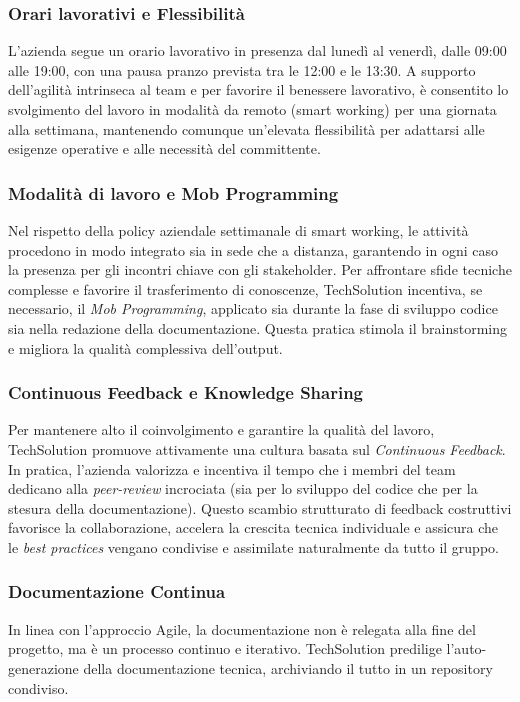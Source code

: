 \documentclass[12pt, a4paper]{article}
\begin{document}
\subsubsection{Orari lavorativi e Flessibilità}
L'azienda segue un orario lavorativo in presenza dal lunedì al venerdì, dalle 09:00 alle 19:00, con una pausa pranzo prevista tra le 12:00 e le 13:30. A supporto dell'agilità intrinseca al team e per favorire il benessere lavorativo, è consentito lo svolgimento del lavoro in modalità da remoto (smart working) per una giornata alla settimana, mantenendo comunque un'elevata flessibilità per adattarsi alle esigenze operative e alle necessità del committente.

\subsubsection{Modalità di lavoro e Mob Programming}
Nel rispetto della policy aziendale settimanale di smart working, le attività procedono in modo integrato sia in sede che a distanza, garantendo in ogni caso la presenza per gli incontri chiave con gli stakeholder. Per affrontare sfide tecniche complesse e favorire il trasferimento di conoscenze, TechSolution incentiva, se necessario, il \textit{Mob Programming}, applicato sia durante la fase di sviluppo codice sia nella redazione della documentazione. Questa pratica stimola il brainstorming e migliora la qualità complessiva dell'output.

\subsubsection{Continuous Feedback e Knowledge Sharing}
Per mantenere alto il coinvolgimento e garantire la qualità del lavoro, TechSolution promuove attivamente una cultura basata sul \textit{Continuous Feedback}. In pratica, l'azienda valorizza e incentiva il tempo che i membri del team dedicano alla \textit{peer-review} incrociata (sia per lo sviluppo del codice che per la stesura della documentazione). Questo scambio strutturato di feedback costruttivi favorisce la collaborazione, accelera la crescita tecnica individuale e assicura che le \textit{best practices} vengano condivise e assimilate naturalmente da tutto il gruppo.

\subsubsection{Documentazione Continua}
In linea con l'approccio Agile, la documentazione non è relegata alla fine del progetto, ma è un processo continuo e iterativo. TechSolution predilige l'auto-generazione della documentazione tecnica, archiviando il tutto in un repository condiviso.
\end{document}
